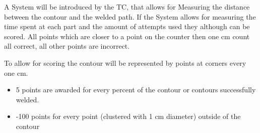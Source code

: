 A System will be introduced by the TC, that allows for Measuring the distance between the contour and the welded path. If the System allows for measuring the time spent at each part and the amount of attempts used they although can be scored. All points which are closer to a point on the counter then one cm count all correct, all other points are incorrect.
\par
To allow for scoring the contour will be represented by points at corners every one cm.

\begin{itemize}
\item 5 points are awarded for every percent of the contour or contours successfully welded.
\item -100 points for every point (clustered with 1 cm diameter) outside of the contour

\end{itemize}


